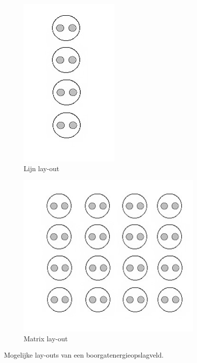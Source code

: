 \documentclass[a4paper,oneside,11pt]{report}
\numberwithin{figure}{section}
\numberwithin{table}{section}
\numberwithin{equation}{section}
\begin{document}
\begin{figure}[hbtp] 
\begin{subfigure}{0.3\textwidth}
	\centering
	\includegraphics[height=0.95\textwidth]{invlf_fig5a.jpg}
	\caption{Lijn lay-out}
\end{subfigure}%
\begin{subfigure}{0.3\textwidth}
	\centering
	\includegraphics[height=0.95\textwidth]{invlf_fig5b.jpg}
	\caption{Matrix lay-out}
\end{subfigure}
\label{fig:invlf_5}
\centering
\caption{Mogelijke lay-outs van een boorgatenergieopslagveld.}
\end{figure}
\end{document}
